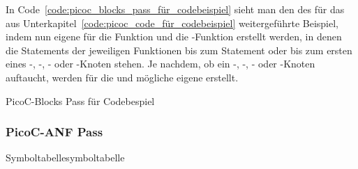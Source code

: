 In Code~\ref{code:picoc_blocks_pass_für_codebeispiel} sieht man den  des  für das aus Unterkapitel~\ref{code:picoc_code_für_codebeispiel} weitergeführte Beispiel, indem nun eigene  für die Funktion  und die -Funktion erstellt werden, in denen die  Statements der jeweiligen Funktionen bis zum  Statement oder bis zum ersten  eines -, -, - oder -Knoten stehen. Je nachdem, ob ein -, -, - oder -Knoten auftaucht, werden für die  und mögliche  eigene  erstellt.

\begin{code}
  \centering
  \caption{PicoC-Blocks Pass für Codebespiel}
  \label{code:picoc_blocks_pass_für_codebeispiel}
\end{code}

\subsubsection{PicoC-ANF Pass}
\label{picoc_mon_pass}

\label{sec:picoc_mon_pass_zweck}


\begin{grammar}
  \toprule
  \commentsecond*
  \midrule
  \arithanf
  \midrule
  \logicanf
  \midrule
  \assignanf
  \midrule
  \pntranf*
  \midrule
  \arrayanf*
  \midrule
  \struct*
  \midrule
  \ifelseanf*
  \midrule
  \funanf*
  \midrule
  \block*
  \midrule
  \fileanf*
  \midrule
  \symbolsecond
  \bottomrule
\end{grammar}

\begin{Definition}{Symboltabelle}{symboltabelle}
\end{Definition}


